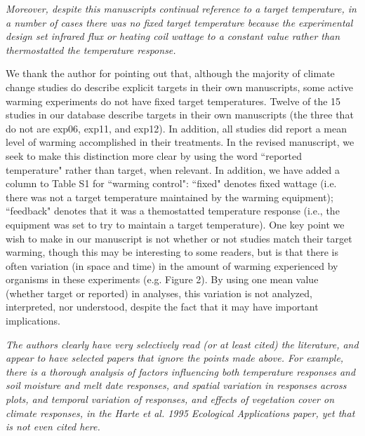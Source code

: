 \documentclass[11pt,a4paper]{letter}
\begin{document}
\par \emph{Moreover, despite this manuscripts continual reference to a target temperature, in a number of cases there  was no fixed target temperature because the experimental design set infrared flux or heating coil wattage to a constant value rather than thermostatted the temperature response.}
\par We thank the author for pointing out that, although the majority of climate change studies do describe explicit targets in their own manuscripts, some active warming experiments do not have fixed target temperatures. Twelve of the 15 studies in our database describe targets in their own manuscripts (the three that do not are exp06, exp11, and exp12). In addition, all studies did report a mean level of warming accomplished in their treatments. In the revised manuscript, we seek to make this distinction  more clear by  using the word ``reported temperature" rather than target, when relevant. In addition, we have added a column to Table S1 for ``warming control": ``fixed" denotes fixed wattage (i.e. there was not a target temperature maintained by the warming equipment); ``feedback" denotes that it was a themostatted temperature response (i.e., the equipment was set to try to maintain a target temperature). One key point we wish to make in our manuscript is not whether or not studies match their target warming, though this may be interesting to some readers, but is that there is often variation (in space and time) in the amount of warming experienced by organisms in these experiments (e.g. Figure 2). By using one mean value (whether target or reported) in analyses, this variation is not analyzed, interpreted, nor understood, despite the fact that it may have important implications.

\emph{The authors clearly have very selectively read (or at least cited) the literature,  and appear to have selected papers that ignore the points made above.  For example, there is a  thorough analysis of factors influencing both temperature responses and soil moisture and melt date responses, and spatial variation in responses across plots,  and temporal variation of responses, and effects of vegetation cover on climate responses, in the Harte et al. 1995 Ecological Applications paper, yet that is not even cited here.}
\end{document}
